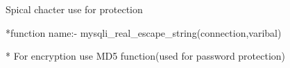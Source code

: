 Spical chacter use for protection

*function name:- mysqli_real_escape_string(connection,varibal)

* For encryption use MD5 function(used for password protection)